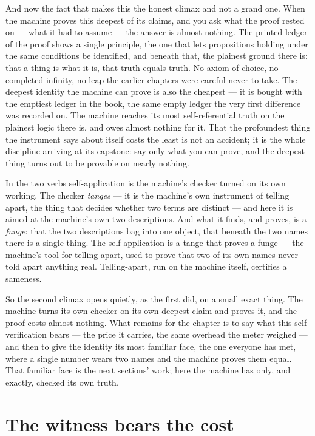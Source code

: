 And now the fact that makes this the honest climax and not a grand one. When the machine proves this deepest of its
claims, and you ask what the proof rested on --- what it had to assume --- the answer is almost nothing. The printed
ledger of the proof shows a single principle, the one that lets propositions holding under the same conditions be
identified, and beneath that, the plainest ground there is: that a thing is what it is, that truth equals truth. No
axiom of choice, no completed infinity, no leap the earlier chapters were careful never to take. The deepest identity
the machine can prove is also the cheapest --- it is bought with the emptiest ledger in the book, the same empty ledger
the very first difference was recorded on. The machine reaches its most self-referential truth on the plainest logic
there is, and owes almost nothing for it. That the profoundest thing the instrument says about itself costs the least
is not an accident; it is the whole discipline arriving at its capstone: say only what you can prove, and the deepest
thing turns out to be provable on nearly nothing.

In the two verbs self-application is the machine's checker turned on its own working. The checker \emph{tanges} --- it
is the machine's own instrument of telling apart, the thing that decides whether two terms are distinct --- and here it
is aimed at the machine's own two descriptions. And what it finds, and proves, is a \emph{funge}: that the two
descriptions bag into one object, that beneath the two names there is a single thing. The self-application is a tange
that proves a funge --- the machine's tool for telling apart, used to prove that two of its own names never told apart
anything real. Telling-apart, run on the machine itself, certifies a sameness.

So the second climax opens quietly, as the first did, on a small exact thing. The machine turns its own checker on its
own deepest claim and proves it, and the proof costs almost nothing. What remains for the chapter is to say what this
self-verification bears --- the price it carries, the same overhead the meter weighed --- and then to give the identity
its most familiar face, the one everyone has met, where a single number wears two names and the machine proves them
equal. That familiar face is the next sections' work; here the machine has only, and exactly, checked its own truth.

\section{The witness bears the cost}


